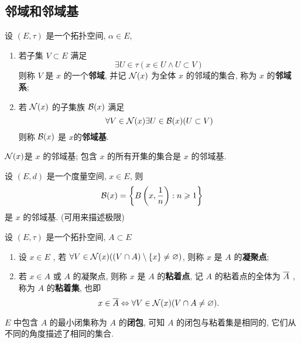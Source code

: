     \subsection{邻域和邻域基}

    \begin{Definition}[邻域基]\label{def:邻域基}
       设 $ (E, \tau) $ 是一个拓扑空间, $ \alpha\in E $,
       \begin{enumerate}[(1)]
          \item 若子集 $ V\subset E $ 满足
          \[
             \exists U\in \tau(x\in U\land U\subset V)
          \]
          则称 $ V $ 是 $ x $ 的一个\textbf{邻域}, 并记 $ \CN(x) $ 为全体 $ x $ 的邻域的集合, 称为 $ x $ 的\textbf{邻域系};
          \item 若 $ \CN(x) $ 的子集族 $ \CB(x) $ 满足
          \[
             \forall V\in \CN(x)\exists U\in \CB(x)(U\subset V)
          \]
          则称 $ \CB(x) $ 是 $ x $的\textbf{邻域基}.
       \end{enumerate}
    \end{Definition}
    \begin{Remark}
       $ \CN(x) $是 $ x $  的邻域基; 包含 $ x $ 的所有开集的集合是 $ x $ 的邻域基.
    \end{Remark}
    \begin{Example}
       设 $ (E, d) $ 是一个度量空间, $ x\in E $, 则
       \[
          \CB(x)=\left\{ B\left(x,\frac{1}{n}\right): n\geqslant 1 \right\}
       \]
       是 $ x $ 的邻域基. (可用来描述极限)
    \end{Example}
    \begin{Definition}[粘着集]
       设 $ (E, \tau) $ 是一个拓扑空间, $ A\subset E $
       \begin{enumerate}[(1)]
          \item 设 $ x\in E $ , 若 $ \forall V\in \CN(x)((V\cap A)\sm \{ x \}\neq\varnothing) $, 则称 $ x $ 是 $ A $ 的\textbf{凝聚点};
          \item 若 $ x\in A $ 或 $ A $  的凝聚点, 则称 $ x $ 是 $ A $ 的\textbf{粘着点}, 记 $ A $ 的粘着点的全体为 $ \baro{A} $ , 称为 $ A $ 的\textbf{粘着集}, 也即
          \[
             x\in \baro{A}\Leftrightarrow \forall V\in \CN(x)(V\cap A\neq\varnothing).
           \]
       \end{enumerate}
    \end{Definition}
    \begin{Remark}
       $ E $ 中包含 $ A $ 的最小闭集称为 $ A $ 的\textbf{闭包}, 可知 $ A $ 的闭包与粘着集是相同的, 它们从不同的角度描述了相同的集合.
    \end{Remark}
